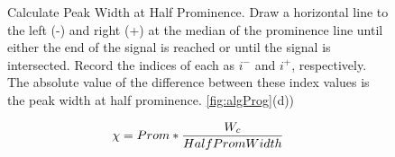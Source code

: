 \begin{figure}
\begin{algorithm}[H]
\DontPrintSemicolon
{}
\caption{\label{alg:width}Calculate Peak Width at Half Prominence. Draw a horizontal line to the left (-) and right (+) at the median of the prominence line until either the end of the signal is reached or until the signal is intersected. Record the indices of each as $i^{-}$ and $i^{+}$, respectively. The absolute value of the difference between these index values is the peak width at half prominence. \ref{fig:algProg}(d))}
\end{algorithm}
\end{figure}

\begin{equation}
\label{eqn:ratio}
\hfill \chi=Prom*\frac{W_c}{HalfPromWidth}\hfill
\end{equation}


